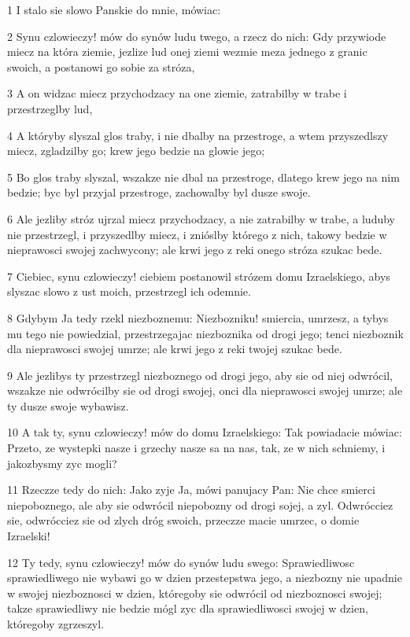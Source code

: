 \par 1 I stalo sie slowo Panskie do mnie, mówiac:
\par 2 Synu czlowieczy! mów do synów ludu twego, a rzecz do nich: Gdy przywiode miecz na która ziemie, jezlize lud onej ziemi wezmie meza jednego z granic swoich, a postanowi go sobie za stróza,
\par 3 A on widzac miecz przychodzacy na one ziemie, zatrabilby w trabe i przestrzeglby lud,
\par 4 A któryby slyszal glos traby, i nie dbalby na przestroge, a wtem przyszedlszy miecz, zgladzilby go; krew jego bedzie na glowie jego;
\par 5 Bo glos traby slyszal, wszakze nie dbal na przestroge, dlatego krew jego na nim bedzie; byc byl przyjal przestroge, zachowalby byl dusze swoje.
\par 6 Ale jezliby stróz ujrzal miecz przychodzacy, a nie zatrabilby w trabe, a luduby nie przestrzegl, i przyszedlby miecz, i znióslby którego z nich, takowy bedzie w nieprawosci swojej zachwycony; ale krwi jego z reki onego stróza szukac bede.
\par 7 Ciebiec, synu czlowieczy! ciebiem postanowil strózem domu Izraelskiego, abys slyszac slowo z ust moich, przestrzegl ich odemnie.
\par 8 Gdybym Ja tedy rzekl niezboznemu: Niezbozniku! smiercia, umrzesz, a tybys mu tego nie powiedzial, przestrzegajac niezboznika od drogi jego; tenci niezboznik dla nieprawosci swojej umrze; ale krwi jego z reki twojej szukac bede.
\par 9 Ale jezlibys ty przestrzegl niezboznego od drogi jego, aby sie od niej odwrócil, wszakze nie odwrócilby sie od drogi swojej, onci dla nieprawosci swojej umrze; ale ty dusze swoje wybawisz.
\par 10 A tak ty, synu czlowieczy! mów do domu Izraelskiego: Tak powiadacie mówiac: Przeto, ze wystepki nasze i grzechy nasze sa na nas, tak, ze w nich schniemy, i jakozbysmy zyc mogli?
\par 11 Rzeczze tedy do nich: Jako zyje Ja, mówi panujacy Pan: Nie chce smierci niepoboznego, ale aby sie odwrócil niepobozny od drogi sojej, a zyl. Odwrócciez sie, odwrócciez sie od zlych dróg swoich, przeczze macie umrzec, o domie Izraelski!
\par 12 Ty tedy, synu czlowieczy! mów do synów ludu swego: Sprawiedliwosc sprawiedliwego nie wybawi go w dzien przestepstwa jego, a niezbozny nie upadnie w swojej niezboznosci w dzien, któregoby sie odwrócil od niezboznosci swojej; takze sprawiedliwy nie bedzie mógl zyc dla sprawiedliwosci swojej w dzien, któregoby zgrzeszyl.
